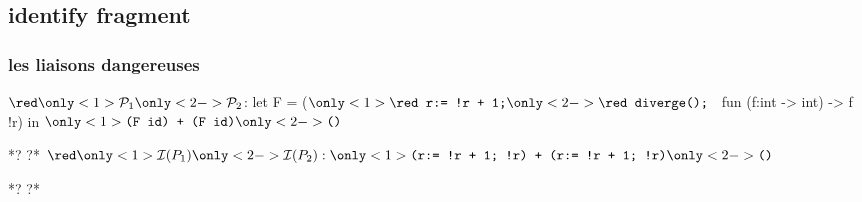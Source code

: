 \subsection*{identify fragment}
\begin{frame}[fragile]\frametitle{les liaisons dangereuses}
\begin{small}
\begin{whycode} 
${\red \only<1>{\mathcal{P}_1}\only<2->{\mathcal{P}_2}}$: 
   let F = 
      ($\only<1>{\texttt{\red r:= !r + 1;}}\only<2->{\texttt{\red diverge(); }}$ fun (f:int -> int) -> f !r)
   in $\only<1>{\texttt{(F id) + (F id)}}\only<2->{\texttt{()}}$
   
*?%
?* 
${\red\only<1>{ \mathcal{I}(P_1)}\only<2->{\mathcal{I}(P_2)}}: \only<1>{\texttt{(r:= !r + 1; !r) + (r:= !r + 1; !r)}}
\only<2->{\texttt{()}}$
   
*?%
?*
\end{whycode}
\end{small}
\end{frame}

